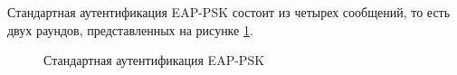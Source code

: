 Стандартная аутентификация EAP-PSK состоит из четырех сообщений, то есть двух раундов, представленных на рисунке \ref{img:standart_aut}.

\begin{figure}[h!]
\caption{Стандартная аутентификация EAP-PSK}
\label{img:standart_aut}
\end{figure}

